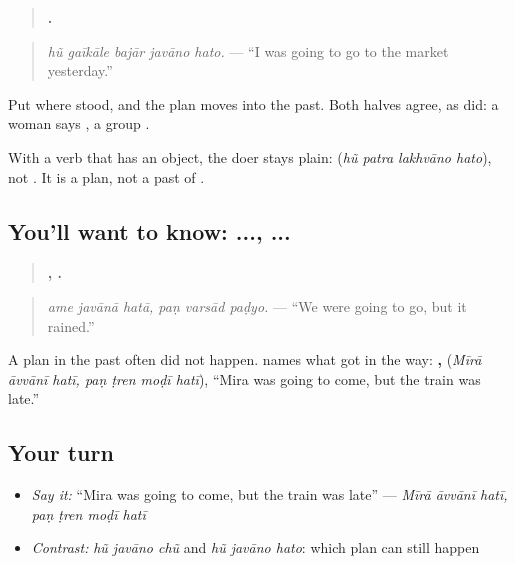\begin{grammarlens}[title={Grammar Lens: \gu{છું} becomes \gu{હતો}}]
\begin{quote}
\textbf{    .}
\end{quote}

\begin{quote}
\emph{hũ gaīkāle bajār javāno hato.} — \textquotedblleft{}I was going to go to the market yesterday.\textquotedblright{}
\end{quote}

Put \textbf{} where \textbf{} stood, and the plan moves into the past. Both halves agree, as \textbf{ } did: a woman says \textbf{ }, a group \textbf{ }.

With a verb that has an object, the doer stays plain: \textbf{   } (\emph{hũ patra lakhvāno hato}), not \textbf{}. It is a plan, not a past of \textbf{}.
\end{grammarlens}

\subsection*{You'll want to know: ...,  ...}
\begin{quote}
\textbf{  ,   .}
\end{quote}

\begin{quote}
\emph{ame javānā hatā, paṇ varsād paḍyo.} — \textquotedblleft{}We were going to go, but it rained.\textquotedblright{}
\end{quote}

A plan in the past often did not happen. \textbf{} names what got in the way: \textbf{  ,    } (\emph{Mīrā āvvānī hatī, paṇ ṭren moḍī hatī}), \textquotedblleft{}Mira was going to come, but the train was late.\textquotedblright{}

\subsection*{Your turn}
\begin{itemize}
\raggedright
  \item \emph{Say it:} \textquotedblleft{}Mira was going to come, but the train was late\textquotedblright{} — \emph{Mīrā āvvānī hatī, paṇ ṭren moḍī hatī}
  \item \emph{Contrast:} \emph{hũ javāno chũ} and \emph{hũ javāno hato}: which plan can still happen
\end{itemize}

